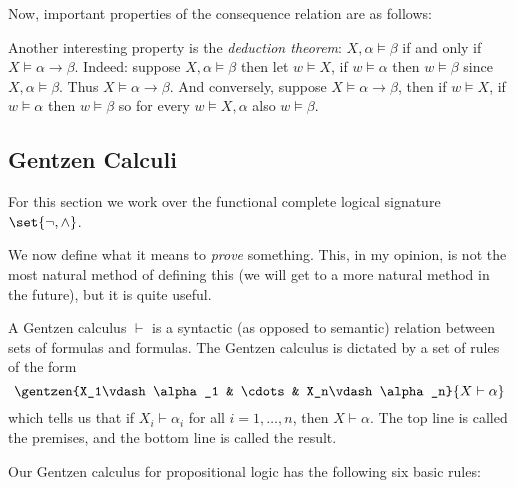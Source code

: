 Now, important properties of the consequence relation are as follows:

\medskip
\centerline{\vbox{}}
\medskip

Another interesting property is the {\it deduction theorem}: $X,\alpha\vDash\beta$ if and only if
$X\vDash\alpha\to\beta$.
Indeed: suppose $X,\alpha\vDash\beta$ then let $w\vDash X$, if $w\vDash\alpha$ then $w\vDash\beta$
since $X,\alpha\vDash\beta$.
Thus $X\vDash\alpha\to\beta$.
And conversely, suppose $X\vDash\alpha\to\beta$, then if $w\vDash X$, if $w\vDash\alpha$ then
$w\vDash\beta$ so for every $w\vDash X,\alpha$ also $w\vDash\beta$.

\subsection{Gentzen Calculi}

For this section we work over the functional complete logical signature $\set{\neg,{\land}}$.

We now define what it means to {\it prove} something.
This, in my opinion, is not the most natural method of defining this (we will get to a more
natural method in the future), but it is quite useful.

\bdefn

    A {\emphcolor Gentzen calculus} $\vdash$ is a syntactic (as opposed to semantic) relation
    between sets of formulas and formulas.
    The Gentzen calculus is dictated by a set of rules of the form
    $$ \gentzen{X_1\vdash\alpha_1 & \cdots & X_n\vdash\alpha_n}{X\vdash\alpha} $$
    which tells us that if $X_i\vdash\alpha_i$ for all $i=1,\dots,n$, then $X\vdash\alpha$.
    The top line is called the premises, and the bottom line is called the result.

    Our Gentzen calculus for propositional logic has the following six basic rules:

    \medskip
    \centerline{\vbox{\jot
    }}
    \medskip

